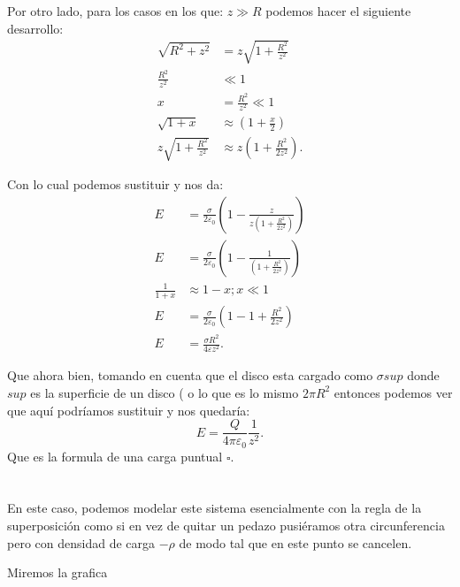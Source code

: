 \documentclass{report}
\begin{document}
Por otro lado, para los casos en los que: $z \gg R$ podemos hacer el siguiente desarrollo:
\begin{align*}
  \sqrt{R^2 + z^2} &= z\sqrt{1 + \frac{R^2}{z^2}}  \\
  \frac{R^2}{z^2} &\ll 1\\
  x &= \frac{R^2}{z^2} \ll 1 \\
  \sqrt{1 + x} &\approx \left( 1 + \frac{x}{2} \right) \\
  z\sqrt{1 + \frac{R^2}{z^2}} &\approx z\left( 1 + \frac{R^2}{2z^2} \right) 
.\end{align*}

Con lo cual podemos sustituir y nos da:
\begin{align*}
  E &= \frac{\sigma}{2\varepsilon_0} \left( 1 - \frac{z}{z\left( 1 + \frac{R^2}{2z^2} \right) } \right) \\
  E &= \frac{\sigma}{2\varepsilon_0} \left( 1 - \frac{1}{\left( 1 + \frac{R^2}{2z^2} \right) } \right) \\
  \frac{1}{1 + x} &\approx 1 - x; x \ll 1\\
  E &= \frac{\sigma}{2\varepsilon_0}\left( 1 - 1 + \frac{R^2}{2z^2} \right)  \\
  E &= \frac{\sigma R^2}{4\varepsilon z^2}
.\end{align*}

Que ahora bien, tomando en cuenta que el disco esta cargado como $\sigma sup$ donde  $sup$ es la superficie de un disco ( o lo que es lo mismo $2\pi R^2$ entonces podemos ver que aquí podríamos sustituir y nos quedaría: \[
E = \frac{Q}{4\pi\varepsilon_0} \frac{1}{z^2}
.\]  Que es la formula de una carga puntual $\square$.

\chapter{}

En este caso, podemos modelar este sistema esencialmente con la regla de la superposición como si en vez de quitar un pedazo pusiéramos otra circunferencia pero con densidad de carga $-\rho$ de modo tal que en este punto se cancelen.

Miremos la grafica


\end{document}
